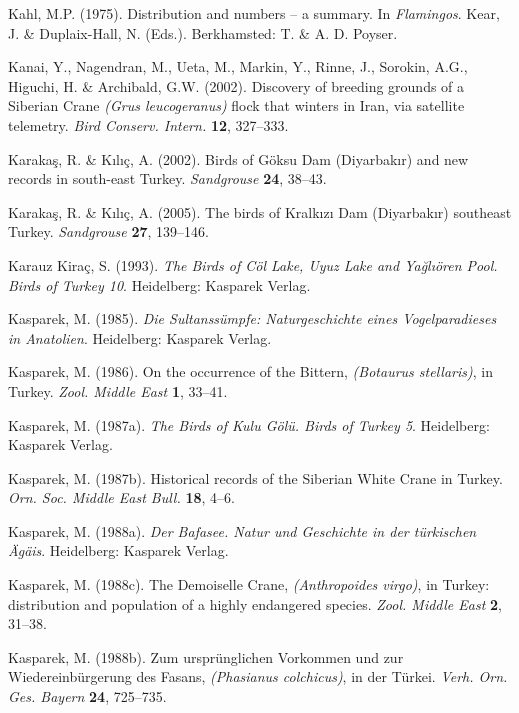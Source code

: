 \documentclass[
  a4paper,
  DIV=11,
  numbers=noendperiod]{scrreprt}
\newlength{\cslhangindent}
\newenvironment{CSLReferences}[2] %
 {\begin{list}{}{%
  \setlength{\itemindent}{0pt}
  \setlength{\leftmargin}{0pt}
  \setlength{\parsep}{0pt}
  \ifodd #1
   \setlength{\leftmargin}{\cslhangindent}
   \setlength{\itemindent}{-1\cslhangindent}
  \fi
  \setlength{\itemsep}{#2\baselineskip}}}
 {\end{list}}
\begin{document}
\begin{CSLReferences}{1}{1}
Kahl, M.P. (1975). {Distribution and numbers -- a summary}. In
\emph{Flamingos}. Kear, J. \& Duplaix-Hall, N. (Eds.). Berkhamsted: T.
\& A. D. Poyser.

Kanai, Y., Nagendran, M., Ueta, M., Markin, Y., Rinne, J., Sorokin,
A.G., Higuchi, H. \& Archibald, G.W. (2002). {Discovery of breeding
grounds of a Siberian Crane \emph{(Grus leucogeranus)} flock that
winters in Iran, via satellite telemetry}. \emph{Bird Conserv. Intern.}
\textbf{12}, 327--333.

Karakaş, R. \& Kılıç, A. (2002). {Birds of Göksu Dam (Diyarbakır) and
new records in south-east Turkey}. \emph{Sandgrouse} \textbf{24},
38--43.

Karakaş, R. \& Kılıç, A. (2005). {The birds of Kralkızı Dam (Diyarbakır)
southeast Turkey}. \emph{Sandgrouse} \textbf{27}, 139--146.

Karauz Kiraç, S. (1993). \emph{{The Birds of Cöl Lake, Uyuz Lake and
Yağlıören Pool. Birds of Turkey 10}}. Heidelberg: Kasparek Verlag.

Kasparek, M. (1985). \emph{{Die Sultanssümpfe: Naturgeschichte eines
Vogelparadieses in Anatolien}}. Heidelberg: Kasparek Verlag.

Kasparek, M. (1986). {On the occurrence of the Bittern, \emph{(Botaurus
stellaris)}, in Turkey}. \emph{Zool. Middle East} \textbf{1}, 33--41.

Kasparek, M. (1987a). \emph{{The Birds of Kulu Gölü. Birds of Turkey
5}}. Heidelberg: Kasparek Verlag.

Kasparek, M. (1987b). {Historical records of the Siberian White Crane in
Turkey}. \emph{Orn. Soc. Middle East Bull.} \textbf{18}, 4--6.

Kasparek, M. (1988a). \emph{{Der Bafasee. Natur und Geschichte in der
türkischen Ägäis}}. Heidelberg: Kasparek Verlag.

Kasparek, M. (1988c). {The Demoiselle Crane, \emph{(Anthropoides
virgo)}, in Turkey: distribution and population of a highly endangered
species}. \emph{Zool. Middle East} \textbf{2}, 31--38.

Kasparek, M. (1988b). {Zum ursprünglichen Vorkommen und zur
Wiedereinbürgerung des Fasans, \emph{(Phasianus colchicus)}, in der
Türkei}. \emph{Verh. Orn. Ges. Bayern} \textbf{24}, 725--735.


\end{CSLReferences}
\end{document}
